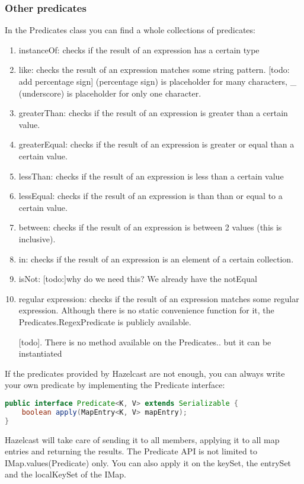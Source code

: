 \subsubsection{Other predicates}
In the Predicates class you can find a whole collections of predicates:
\begin{enumerate}
\item instanceOf: checks if the result of an expression has a certain type
\item like: checks the result of an expression matches some string pattern. [todo: add percentage sign] (percentage sign) is placeholder for many characters, _ (underscore) is placeholder for only one character.
\item greaterThan: checks if the result of an expression is greater than a certain value.
\item greaterEqual: checks if the result of an expression is greater or equal than a certain value.
\item lessThan: checks if the result of an expression is less than a certain value
\item lessEqual: checks if the result of an expression is than than or equal to a certain value.
\item between: checks if the result of an expression is between 2 values (this is inclusive).
\item in: checks if the result of an expression is an element of a certain collection.
\item isNot: [todo:]why do we need this? We already have the notEqual
\item regular expression: checks if the result of an expression matches some regular expression. Although there is no static convenience function for it, the Predicates.RegexPredicate is publicly available.

[todo]. There is no method available on the Predicates.. but it can be instantiated 
\end{enumerate}
If the predicates provided by Hazelcast are not enough, you can always write your own predicate by implementing the Predicate interface:
\begin{lstlisting}[language=java]
public interface Predicate<K, V> extends Serializable {
    boolean apply(MapEntry<K, V> mapEntry);
}
\end{lstlisting}
Hazelcast will take care of sending it to all members, applying it to all map entries and returning the results. The Predicate API is not limited to IMap.values(Predicate) only. You can also apply it on the keySet, the entrySet and the localKeySet of the IMap.


